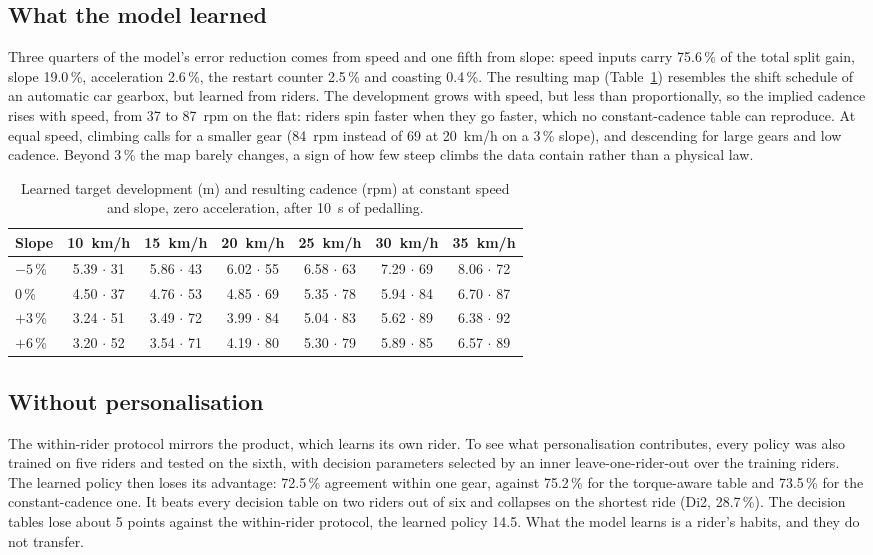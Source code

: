 \documentclass[conference]{IEEEtran}
\newcommand{\pct}{\,\%}
\begin{document}
\subsection{What the model learned}
Three quarters of the model's error reduction comes from speed and one fifth from slope: speed inputs carry 75.6\pct{} of the total split gain, slope 19.0\pct{}, acceleration 2.6\pct{}, the restart counter 2.5\pct{} and coasting 0.4\pct{}. The resulting map (Table~\ref{tab:map}) resembles the shift schedule of an automatic car gearbox, but learned from riders. The development grows with speed, but less than proportionally, so the implied cadence rises with speed, from 37 to 87~rpm on the flat: riders spin faster when they go faster, which no constant-cadence table can reproduce. At equal speed, climbing calls for a smaller gear (84~rpm instead of 69 at 20~km/h on a 3\pct{} slope), and descending for large gears and low cadence. Beyond 3\pct{} the map barely changes, a sign of how few steep climbs the data contain rather than a physical law.

\begin{table}[t]
\centering
\caption{Learned target development (m) and resulting cadence (rpm) at constant speed and slope, zero acceleration, after 10~s of pedalling.}
\label{tab:map}
\setlength{\tabcolsep}{2.2pt}
\begin{tabular}{@{}lcccccc@{}}
\toprule
Slope & 10~km/h & 15~km/h & 20~km/h & 25~km/h & 30~km/h & 35~km/h \\
\midrule
$-5$\pct & 5.39 $\cdot$ 31 & 5.86 $\cdot$ 43 & 6.02 $\cdot$ 55 & 6.58 $\cdot$ 63 & 7.29 $\cdot$ 69 & 8.06 $\cdot$ 72 \\
0\pct & 4.50 $\cdot$ 37 & 4.76 $\cdot$ 53 & 4.85 $\cdot$ 69 & 5.35 $\cdot$ 78 & 5.94 $\cdot$ 84 & 6.70 $\cdot$ 87 \\
$+3$\pct & 3.24 $\cdot$ 51 & 3.49 $\cdot$ 72 & 3.99 $\cdot$ 84 & 5.04 $\cdot$ 83 & 5.62 $\cdot$ 89 & 6.38 $\cdot$ 92 \\
$+6$\pct & 3.20 $\cdot$ 52 & 3.54 $\cdot$ 71 & 4.19 $\cdot$ 80 & 5.30 $\cdot$ 79 & 5.89 $\cdot$ 85 & 6.57 $\cdot$ 89 \\
\bottomrule
\end{tabular}
\end{table}

\subsection{Without personalisation}
The within-rider protocol mirrors the product, which learns its own rider. To see what personalisation contributes, every policy was also trained on five riders and tested on the sixth, with decision parameters selected by an inner leave-one-rider-out over the training riders. The learned policy then loses its advantage: 72.5\pct{} agreement within one gear, against 75.2\pct{} for the torque-aware table and 73.5\pct{} for the constant-cadence one. It beats every decision table on two riders out of six and collapses on the shortest ride (Di2, 28.7\pct{}). The decision tables lose about 5 points against the within-rider protocol, the learned policy 14.5. What the model learns is a rider's habits, and they do not transfer.
\end{document}
